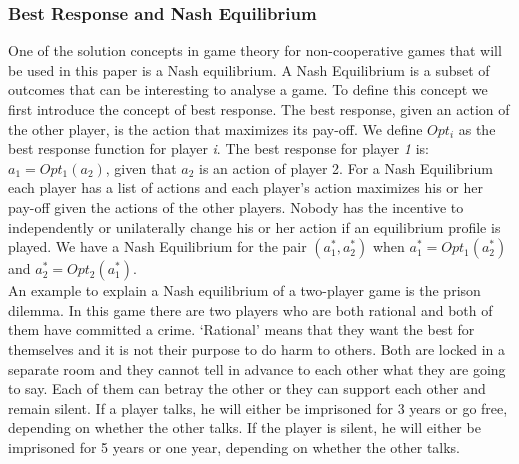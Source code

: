 \subsubsection{Best Response and Nash Equilibrium}
One of the solution concepts in game theory for non-cooperative games that will be used in this paper is a Nash equilibrium. A Nash Equilibrium is a subset of outcomes that can be interesting to analyse a game. To define this concept we first introduce the concept of best response. The best response, given an action of the other player, is the action that maximizes its pay-off.  We define $Opt_{i}$ as the best response function for player \textit{i}. The best response for player \textit{1} is: $a_{1} = Opt_{1}(a_{2})$, given that $a_{2}$ is an action of player 2. For a Nash Equilibrium each player has a list of actions and each player's action maximizes his or her pay-off given the actions of the other players. Nobody has the incentive to independently or unilaterally change his or her action if an equilibrium profile is played. We have a Nash Equilibrium for the pair $(a_{1}^{*},a_{2}^{*})$ when $a_{1}^{*} = Opt_{1}(a_{2}^{*})$ and $a_{2}^{*} = Opt_{2}(a_{1}^{*})$.\\


An example to explain a Nash equilibrium of a two-player game is the prison dilemma. In this game there are two players who are both rational and both of them have committed a crime. `Rational' means that they want the best for themselves and it is not their purpose to do harm to others. Both are locked in a separate room and they cannot tell in advance to each other what they are going to say. Each of them can betray the other or they can support each other and remain silent. If a player talks, he will either be imprisoned for 3 years or go free, depending on whether the other talks. If the player is silent, he will either be imprisoned for 5 years or one year, depending on whether the other talks.  


